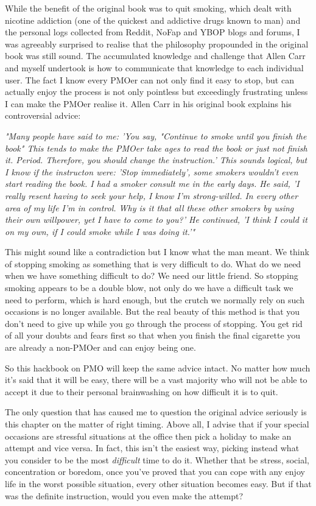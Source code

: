 \documentclass[easypeasy.tex]{subfiles}
\begin{document}
While the benefit of the original book was to quit smoking, which dealt with nicotine addiction (one of the quickest and addictive drugs known to man) and the personal logs collected from Reddit, NoFap and YBOP blogs and forums, I was agreeably surprised to realise that the philosophy propounded in the original book was still sound. The accumulated knowledge and challenge that Allen Carr and myself undertook is how to communicate that knowledge to each individual user. The fact I know every PMOer can not only find it easy to stop, but can actually enjoy the process is not only pointless but exceedingly frustrating unless I can make the PMOer realise it. Allen Carr in his original book explains his controversial advice:

  \textit{"Many people have said to me: 'You say, "Continue to smoke until you finish the book" This tends to make the PMOer take ages to read the book or just not finish it. Period. Therefore, you should change the instruction.' This sounds logical, but I know if the instructon were: 'Stop immediately', some smokers wouldn't even start reading the book. I had a smoker consult me in the early days. He said, 'I really resent having to seek your help, I know I'm strong-willed. In every other area of my life I'm in control. Why is it that all these other smokers by using their own willpower, yet I have to come to you?' He continued, 'I think I could it on my own, if I could smoke while I was doing it.'"}

This might sound like a contradiction but I know what the man meant. We think of stopping smoking as something that is very difficult to do. What do we need when we have something difficult to do? We need our little friend. So stopping smoking appears to be a double blow, not only do we have a difficult task we need to perform, which is hard enough, but the crutch we normally rely on such occasions is no longer available. But the real beauty of this method is that you don't need to give up while you go through the process of stopping. You get rid of all your doubts and fears first so that when you finish the final cigarette you are already a non-PMOer and can enjoy being one.

So this hackbook on PMO will keep the same advice intact. No matter how much it's said that it will be easy, there will be a vast majority who will not be able to accept it due to their personal brainwashing on how difficult it is to quit.

The only question that has caused me to question the original advice seriously is this chapter on the matter of right timing. Above all, I advise that if your special occasions are stressful situations at the office then pick a holiday to make an attempt and vice versa. In fact, this isn't the easiest way, picking instead what you consider to be the most \textit{difficult} time to do it. Whether that be stress, social, concentration or boredom, once you've proved that you can cope with any enjoy life in the worst possible situation, every other situation becomes easy. But if that was the definite instruction, would you even make the attempt?
\end{document}
